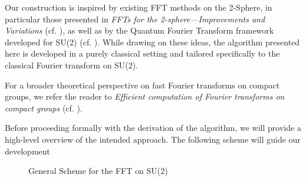 \documentclass[11pt]{article}
\theoremstyle{definition}
\theoremstyle{remark}
\numberwithin{equation}{section}
\begin{document}
Our construction is inspired by existing FFT methods on the 2-Sphere, in particular those presented in \textit{FFTs for the 2-sphere—Improvements and Variations} (cf. \cite{2-sphere}), as well as by the Quantum Fourier Transform framework developed for SU(2) (cf. \cite{Quantum_SU(2)}). 
While drawing on these ideas, the algorithm presented here is developed in a purely classical setting and tailored specifically to the classical Fourier transform on SU(2).

For a broader theoretical perspective on fast Fourier transforms on compact groups, we refer the reader to \textit{Efficient computation of Fourier transforms on compact groups} (cf. \cite{FFT_Compact_Groups}).

Before proceeding formally with the derivation of the algorithm, we will provide a high-level overview of the intended approach. The following scheme will guide our development
\begin{figure}[H]
\centering
{}
\caption{General Scheme for the FFT on SU(2)}
\label{fig:fft_su2}
\end{figure}
\end{document}
